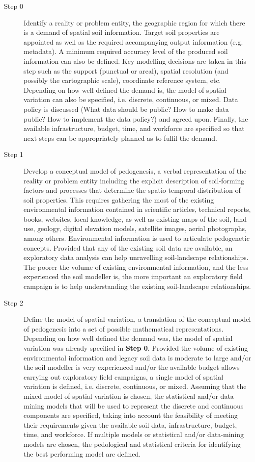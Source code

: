 \begin{description}
\item[Step 0] Identify a reality or problem entity, the geographic region for which there is a demand of 
spatial soil information. Target soil properties are appointed as well as the required accompanying output 
information (e.g. metadata). A minimum required accuracy level of the produced soil information can also be 
defined. Key modelling decisions are taken in this step such as the support (punctual or areal), spatial 
resolution (and possibly the cartographic scale), coordinate reference system, etc. Depending on how well 
defined the demand is, the model of spatial variation can also be specified, i.e. discrete, continuous, or 
mixed. Data policy is discussed (What data should be public? How to make data public? How to implement the 
data policy?) and agreed upon. Finally, the available infrastructure, budget, time, and workforce are 
specified so that next steps can be appropriately planned as to fulfil the demand.

\item[Step 1] Develop a conceptual model of pedogenesis, a verbal representation of the reality or problem 
entity including the explicit description of soil-forming factors and processes that determine the 
spatio-temporal distribution of soil properties. This requires gathering the most of the existing 
environmental information contained in scientific articles, technical reports, books, websites, local 
knowledge, as well as existing maps of the soil, land use, geology, digital elevation models, satellite 
images, aerial photographs, among others. Environmental information is used to articulate pedogenetic 
concepts. Provided that any of the existing soil data are available, an exploratory data analysis can help 
unravelling soil-landscape relationships. The poorer the volume of existing environmental information, and the 
less experienced the soil modeller is, the more important an exploratory field campaign is to help 
understanding the existing soil-landscape relationships.

\item[Step 2] Define the model of spatial variation, a translation of the conceptual model of pedogenesis into 
a set of possible mathematical representations. Depending on how well defined the demand was, the model of 
spatial variation was already specified in \textbf{Step 0}. Provided the volume of existing environmental 
information and legacy soil data is moderate to large and/or the soil modeller is very experienced and/or the 
available budget allows carrying out exploratory field campaigns, a single model of spatial variation is
defined, i.e. discrete, continuous, or mixed. Assuming that the mixed model of spatial variation is chosen, 
the statistical and/or data-mining models that will be used to represent the discrete and continuous 
components are specified, taking into account the feasibility of meeting their requirements given the 
available soil data, infrastructure, budget, time, and workforce. If multiple models or statistical and/or 
data-mining models are chosen, the pedological and statistical criteria for identifying the best performing 
model are defined.


\end{description}
